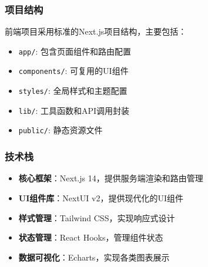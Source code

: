\subsubsection{项目结构}
前端项目采用标准的Next.js项目结构，主要包括：
\begin{itemize}
    \item \texttt{app/}: 包含页面组件和路由配置
    \item \texttt{components/}: 可复用的UI组件
    \item \texttt{styles/}: 全局样式和主题配置
    \item \texttt{lib/}: 工具函数和API调用封装
    \item \texttt{public/}: 静态资源文件
\end{itemize}

\subsubsection{技术栈}
\begin{itemize}
    \item \textbf{核心框架}：Next.js 14，提供服务端渲染和路由管理
    \item \textbf{UI组件库}：NextUI v2，提供现代化的UI组件
    \item \textbf{样式管理}：Tailwind CSS，实现响应式设计
    \item \textbf{状态管理}：React Hooks，管理组件状态
    \item \textbf{数据可视化}：Echarts，实现各类图表展示
\end{itemize}

